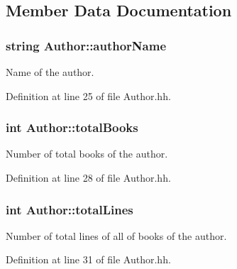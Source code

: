 \subsection{Member Data Documentation}
\subsubsection[{\texorpdfstring{author\+Name}{authorName}}]{\setlength{\rightskip}{0pt plus 5cm}string Author\+::author\+Name\hspace{0.3cm}{\ttfamily [private]}}\hypertarget{class_author_a146b76b89d701097c36fb5d29df27bc4}{}\label{class_author_a146b76b89d701097c36fb5d29df27bc4}


Name of the author. 



Definition at line 25 of file Author.\+hh.

\subsubsection[{\texorpdfstring{total\+Books}{totalBooks}}]{\setlength{\rightskip}{0pt plus 5cm}int Author\+::total\+Books\hspace{0.3cm}{\ttfamily [private]}}\hypertarget{class_author_ac870b8c861aa0f69cd2c4e7b8d414902}{}\label{class_author_ac870b8c861aa0f69cd2c4e7b8d414902}


Number of total books of the author. 



Definition at line 28 of file Author.\+hh.

\subsubsection[{\texorpdfstring{total\+Lines}{totalLines}}]{\setlength{\rightskip}{0pt plus 5cm}int Author\+::total\+Lines\hspace{0.3cm}{\ttfamily [private]}}\hypertarget{class_author_a8d818414bbd909287641b388601bf61a}{}\label{class_author_a8d818414bbd909287641b388601bf61a}


Number of total lines of all of books of the author. 



Definition at line 31 of file Author.\+hh.

